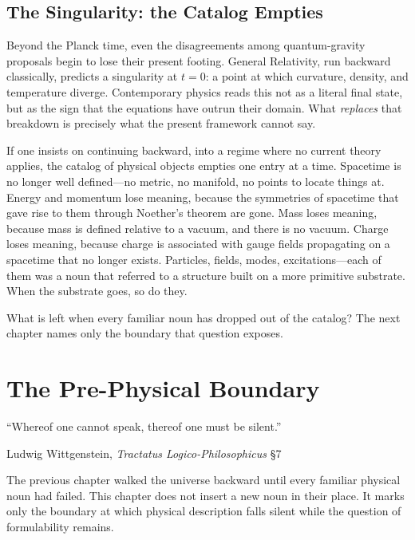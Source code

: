 \documentclass[11pt,a4paper]{book}
\begin{document}
\section*{The Singularity: the Catalog Empties}

Beyond the Planck time, even the disagreements among quantum-gravity proposals begin to lose their present footing. General Relativity, run backward classically, predicts a singularity at $t = 0$: a point at which curvature, density, and temperature diverge. Contemporary physics reads this not as a literal final state, but as the sign that the equations have outrun their domain. What \emph{replaces} that breakdown is precisely what the present framework cannot say.

If one insists on continuing backward, into a regime where no current theory applies, the catalog of physical objects empties one entry at a time. Spacetime is no longer well defined---no metric, no manifold, no points to locate things at. Energy and momentum lose meaning, because the symmetries of spacetime that gave rise to them through Noether's theorem are gone. Mass loses meaning, because mass is defined relative to a vacuum, and there is no vacuum. Charge loses meaning, because charge is associated with gauge fields propagating on a spacetime that no longer exists. Particles, fields, modes, excitations---each of them was a noun that referred to a structure built on a more primitive substrate. When the substrate goes, so do they.

What is left when every familiar noun has dropped out of the catalog? The next chapter names only the boundary that question exposes.

\chapter{The Pre-Physical Boundary}
\label{ch:pre-physical-boundary}

\epigraph{``Whereof one cannot speak, thereof one must be silent.''}{Ludwig Wittgenstein, \textit{Tractatus Logico-Philosophicus} \S 7}

The previous chapter walked the universe backward until every familiar physical noun had failed. This chapter does not insert a new noun in their place. It marks only the boundary at which physical description falls silent while the question of formulability remains.
\end{document}
